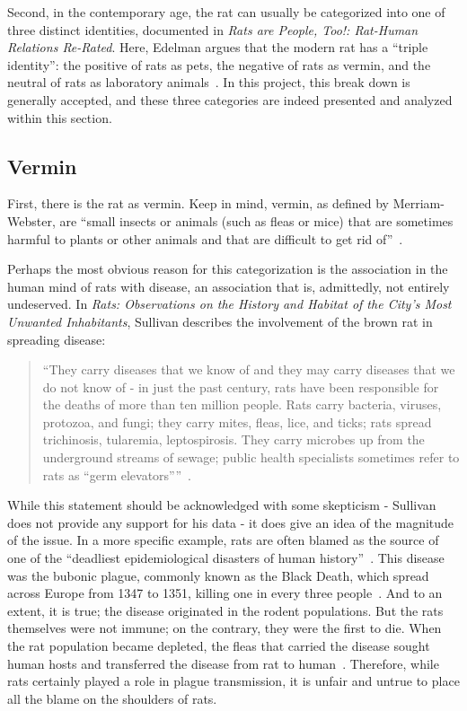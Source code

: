 \documentclass[12pt]{article}
\begin{document}
Second, in the contemporary age, the rat can usually be categorized into one of three distinct identities, documented in \textit{Rats are People, Too!: Rat-Human Relations Re-Rated}. Here, Edelman argues that the modern rat has a ``triple identity'': the positive of rats as pets, the negative of rats as vermin, and the neutral of rats as laboratory animals~\cite{Edelman2002}. In this project, this break down is generally accepted, and these three categories are indeed presented and analyzed within this section.

\subsection{Vermin} \label{Disease}

First, there is the rat as vermin. Keep in mind, vermin, as defined by Merriam-Webster, are ``small insects or animals (such as fleas or mice) that are sometimes harmful to plants or other animals and that are difficult to get rid of''~\cite{MerriamWebster}.

Perhaps the most obvious reason for this categorization is the association in the human mind of rats with disease, an association that is, admittedly, not entirely undeserved. In \textit{Rats: Observations on the History and Habitat of the City's Most Unwanted Inhabitants}, Sullivan describes the involvement of the brown rat in spreading disease:

\begin{quote}
``They carry diseases that we know of and they may carry diseases that we do not know of - in just the past century, rats have been responsible for the deaths of more than ten million people. Rats carry bacteria, viruses, protozoa, and fungi; they carry mites, fleas, lice, and ticks; rats spread trichinosis, tularemia, leptospirosis. They carry microbes up from the underground streams of sewage; public health specialists sometimes refer to rats as ``germ elevators''''~\cite{Sullivan2004}.
\end{quote}

While this statement should be acknowledged with some skepticism - Sullivan does not provide any support for his data - it does give an idea of the magnitude of the issue. In a more specific example, rats are often blamed as the source of one of the ``deadliest epidemiological disasters of human history''~\cite{ONeill}. This disease was the bubonic plague, commonly known as the Black Death, which spread across Europe from 1347 to 1351, killing one in every three people~\cite{Gottfried1983}. And to an extent, it is true; the disease originated in the rodent populations. But the rats themselves were not immune; on the contrary, they were the first to die. When the rat population became depleted, the fleas that carried the disease sought human hosts and transferred the disease from rat to human~\cite{Marrin2006, ONeill}. Therefore, while rats certainly played a role in plague transmission, it is unfair and untrue to place all the blame on the shoulders of rats.
\end{document}
